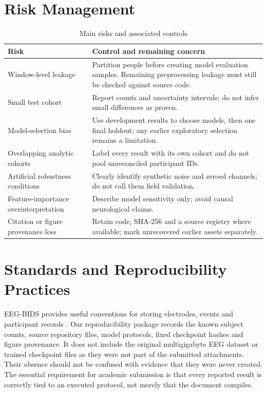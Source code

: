 \section{Risk Management}
\begin{table}[H]\centering\small
\caption{Main risks and associated controls}\label{tab:risks}
\begin{tabularx}{\textwidth}{@{}>{\RaggedRight\arraybackslash}p{}>{\RaggedRight\arraybackslash}X@{}}\toprule
\textbf{Risk}&\textbf{Control and remaining concern}\\\midrule
Window-level leakage&Partition people before creating model evaluation samples. Remaining preprocessing leakage must still be checked against source code.\\
Small test cohort&Report counts and uncertainty intervals; do not infer small differences as proven.\\
Model-selection bias&Use development results to choose models, then one final holdout; any earlier exploratory selection remains a limitation.\\
Overlapping analytic cohorts&Label every result with its own cohort and do not pool unreconciled participant IDs.\\
Artificial robustness conditions&Clearly identify synthetic noise and zeroed channels; do not call them field validation.\\
Feature-importance overinterpretation&Describe model sensitivity only; avoid causal neurological claims.\\
Citation or figure provenance loss&Retain code, SHA-256 and a source registry where available; mark unrecovered earlier assets separately.\\
\bottomrule\end{tabularx}\end{table}

\section{Standards and Reproducibility Practices}
EEG-BIDS provides useful conventions for storing electrodes, events and participant records \cite{pernet2019}. Our reproducibility package records the known subject counts, source repository files, model protocols, fixed checkpoint hashes and figure provenance. It does not include the original multigigabyte EEG dataset or trained checkpoint files as they were not part of the submitted attachments. Their absence should not be confused with evidence that they were never created. The essential requirement for academic submission is that every reported result is correctly tied to an executed protocol, not merely that the document compiles.
